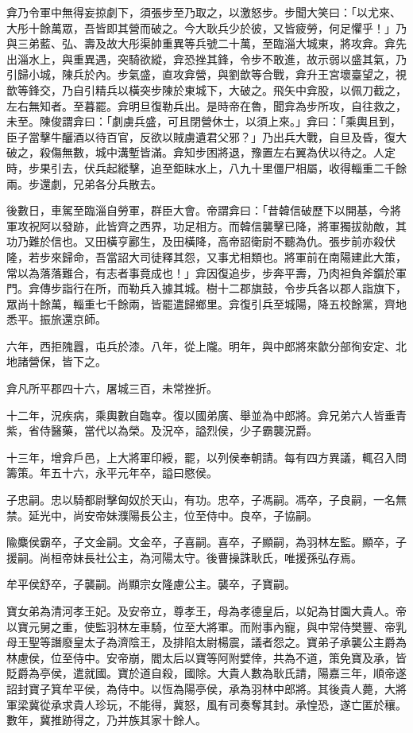 \begin{pinyinscope}
弇乃令軍中無得妄掠劇下，須張步至乃取之，以激怒步。步聞大笑曰：「以尤來、大彤十餘萬眾，吾皆即其營而破之。今大耿兵少於彼，又皆疲勞，何足懼乎！」乃與三弟藍、弘、壽及故大彤渠帥重異等兵號二十萬，至臨淄大城東，將攻弇。弇先出淄水上，與重異遇，突騎欲縱，弇恐挫其鋒，令步不敢進，故示弱以盛其氣，乃引歸小城，陳兵於內。步氣盛，直攻弇營，與劉歆等合戰，弇升王宮壞臺望之，視歆等鋒交，乃自引精兵以橫突步陳於東城下，大破之。飛矢中弇股，以佩刀截之，左右無知者。至暮罷。弇明旦復勒兵出。是時帝在魯，聞弇為步所攻，自往救之，未至。陳俊謂弇曰：「劇虜兵盛，可且閉營休士，以須上來。」弇曰：「乘輿且到，臣子當擊牛釃酒以待百官，反欲以賊虜遺君父邪？」乃出兵大戰，自旦及昏，復大破之，殺傷無數，城中溝塹皆滿。弇知步困將退，豫置左右翼為伏以待之。人定時，步果引去，伏兵起縱擊，追至鉅昧水上，八九十里僵尸相屬，收得輜重二千餘兩。步還劇，兄弟各分兵散去。

後數日，車駕至臨淄自勞軍，群臣大會。帝謂弇曰：「昔韓信破歷下以開基，今將軍攻祝阿以發跡，此皆齊之西界，功足相方。而韓信襲擊已降，將軍獨拔勍敵，其功乃難於信也。又田橫亨酈生，及田橫降，高帝詔衛尉不聽為仇。張步前亦殺伏隆，若步來歸命，吾當詔大司徒釋其怨，又事尤相類也。將軍前在南陽建此大策，常以為落落難合，有志者事竟成也！」弇因復追步，步奔平壽，乃肉袒負斧鑕於軍門。弇傳步詣行在所，而勒兵入據其城。樹十二郡旗鼓，令步兵各以郡人詣旗下，眾尚十餘萬，輜重七千餘兩，皆罷遣歸鄉里。弇復引兵至城陽，降五校餘黨，齊地悉平。振旅還京師。

六年，西拒隗囂，屯兵於漆。八年，從上隴。明年，與中郎將來歙分部徇安定、北地諸營保，皆下之。

弇凡所平郡四十六，屠城三百，未常挫折。

十二年，況疾病，乘輿數自臨幸。復以國弟廣、舉並為中郎將。弇兄弟六人皆垂青紫，省侍醫藥，當代以為榮。及況卒，謚烈侯，少子霸襲況爵。

十三年，增弇戶邑，上大將軍印綬，罷，以列侯奉朝請。每有四方異議，輒召入問籌策。年五十六，永平元年卒，謚曰愍侯。

子忠嗣。忠以騎都尉擊匈奴於天山，有功。忠卒，子馮嗣。馮卒，子良嗣，一名無禁。延光中，尚安帝妹濮陽長公主，位至侍中。良卒，子協嗣。

隃麋侯霸卒，子文金嗣。文金卒，子喜嗣。喜卒，子顯嗣，為羽林左監。顯卒，子援嗣。尚桓帝妹長社公主，為河陽太守。後曹操誅耿氏，唯援孫弘存焉。

牟平侯舒卒，子襲嗣。尚顯宗女隆慮公主。襲卒，子寶嗣。

寶女弟為清河孝王妃。及安帝立，尊孝王，母為孝德皇后，以妃為甘園大貴人。帝以寶元舅之重，使監羽林左車騎，位至大將軍。而附事內寵，與中常侍樊豐、帝乳母王聖等譖廢皇太子為濟陰王，及排陷太尉楊震，議者怨之。寶弟子承襲公主爵為林慮侯，位至侍中。安帝崩，閻太后以寶等阿附嬖倖，共為不道，策免寶及承，皆貶爵為亭侯，遣就國。寶於道自殺，國除。大貴人數為耿氏請，陽嘉三年，順帝遂詔封寶子箕牟平侯，為侍中。以恆為陽亭侯，承為羽林中郎將。其後貴人薨，大將軍梁冀從承求貴人珍玩，不能得，冀怒，風有司奏奪其封。承惶恐，遂亡匿於穰。數年，冀推跡得之，乃并族其家十餘人。


\end{pinyinscope}
